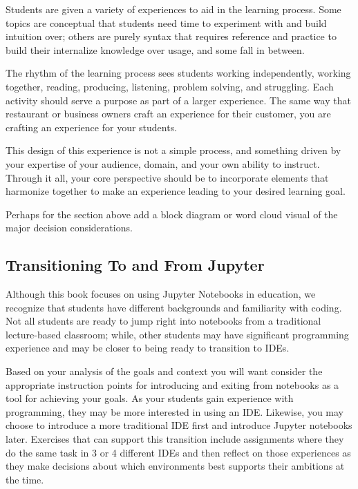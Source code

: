 \documentclass[]{book}
\begin{document}
Students are given a variety of experiences to aid in the learning
process. Some topics are conceptual that students need time to
experiment with and build intuition over; others are purely syntax that
requires reference and practice to build their internalize knowledge
over usage, and some fall in between.

The rhythm of the learning process sees students working independently,
working together, reading, producing, listening, problem solving, and
struggling. Each activity should serve a purpose as part of a larger
experience. The same way that restaurant or business owners craft an
experience for their customer, you are crafting an experience for your
students.

This design of this experience is not a simple process, and something
driven by your expertise of your audience, domain, and your own ability
to instruct. Through it all, your core perspective should be to
incorporate elements that harmonize together to make an experience
leading to your desired learning goal.

Perhaps for the section above add a block diagram or word cloud visual
of the major decision considerations.

\subsection{Transitioning To and From
Jupyter}\label{transitioning-to-and-from-jupyter}

Although this book focuses on using Jupyter Notebooks in education, we
recognize that students have different backgrounds and familiarity with
coding. Not all students are ready to jump right into notebooks from a
traditional lecture-based classroom; while, other students may have
significant programming experience and may be closer to being ready to
transition to IDEs.

Based on your analysis of the goals and context you will want consider
the appropriate instruction points for introducing and exiting from
notebooks as a tool for achieving your goals. As your students gain
experience with programming, they may be more interested in using an
IDE. Likewise, you may choose to introduce a more traditional IDE first
and introduce Jupyter notebooks later. Exercises that can support this
transition include assignments where they do the same task in 3 or 4
different IDEs and then reflect on those experiences as they make
decisions about which environments best supports their ambitions at the
time.
\end{document}

